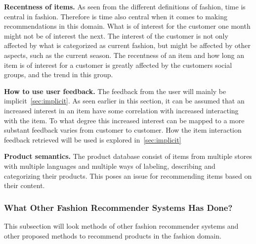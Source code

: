 \textbf{Recentness of items.}
As seen from the different definitions of fashion, time is central in fashion.
Therefore is time also central when it comes to making recommendations in this domain.
What is of interest for the customer one month might not be of interest the next.
The interest of the customer is not only affected by what is categorized as current fashion, but might be affected by other aspects, such as the current season.
The recentness of an item and how long an item is of interest for a customer is greatly affected by the customers social groups, and the trend in this group.

\textbf{How to use user feedback.}
The feedback from the user will mainly be implicit~\ref{sec:implicit}.
As seen earlier in this section, it can be assumed that an increased interest in an item have some correlation with increased interacting with the item.
To what degree this increased interest can be mapped to a more substant  feedback varies from customer to customer.
How the item interaction feedback retrieved will be used is explored in~\ref{sec:implicit}

\textbf{Product semantics.}
The product database consist of items from multiple stores with multiple languages and multiple ways of labeling, describing and categorizing their products.
This poses an issue for recommending items based on their content.



\subsubsection{What Other Fashion Recommender Systems Has Done?}
This subsection will look methods of other fashion recommender systems and other proposed methods to recommend products in the fashion domain.

